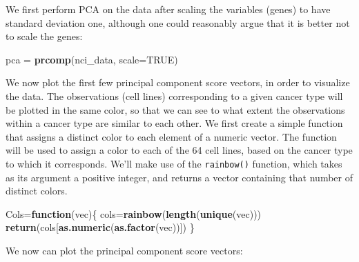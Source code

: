 \documentclass[
  openany]{book}
\newenvironment{Shaded}{\begin{snugshade}}{\end{snugshade}}
\newcommand{\ControlFlowTok}[1]{\textcolor[rgb]{0.13,0.29,0.53}{\textbf{#1}}}
\newcommand{\DataTypeTok}[1]{\textcolor[rgb]{0.13,0.29,0.53}{#1}}
\newcommand{\DecValTok}[1]{\textcolor[rgb]{0.00,0.00,0.81}{#1}}
\newcommand{\KeywordTok}[1]{\textcolor[rgb]{0.13,0.29,0.53}{\textbf{#1}}}
\newcommand{\NormalTok}[1]{#1}
\newcommand{\OperatorTok}[1]{\textcolor[rgb]{0.81,0.36,0.00}{\textbf{#1}}}
\newcommand{\OtherTok}[1]{\textcolor[rgb]{0.56,0.35,0.01}{#1}}
\newcommand{\StringTok}[1]{\textcolor[rgb]{0.31,0.60,0.02}{#1}}
\begin{document}
We first perform PCA on the data after scaling the variables (genes) to
have standard deviation one, although one could reasonably argue that it
is better not to scale the genes:

\begin{Shaded}
\begin{Highlighting}[]
\NormalTok{pca =}\StringTok{ }\KeywordTok{prcomp}\NormalTok{(nci_data, }\DataTypeTok{scale=}\OtherTok{TRUE}\NormalTok{)}
\end{Highlighting}
\end{Shaded}

We now plot the first few principal component score vectors, in order to
visualize the data. The observations (cell lines) corresponding to a given
cancer type will be plotted in the same color, so that we can see to what
extent the observations within a cancer type are similar to each other. We
first create a simple function that assigns a distinct color to each element
of a numeric vector. The function will be used to assign a color to each of
the 64 cell lines, based on the cancer type to which it corresponds.
We'll make use of the \texttt{rainbow()} function, which takes as its argument a positive integer,
and returns a vector containing that number of distinct colors.

\begin{Shaded}
\begin{Highlighting}[]
\NormalTok{Cols=}\ControlFlowTok{function}\NormalTok{(vec)\{}
\NormalTok{    cols=}\KeywordTok{rainbow}\NormalTok{(}\KeywordTok{length}\NormalTok{(}\KeywordTok{unique}\NormalTok{(vec)))}
    \KeywordTok{return}\NormalTok{(cols[}\KeywordTok{as.numeric}\NormalTok{(}\KeywordTok{as.factor}\NormalTok{(vec))])}
\NormalTok{  \}}
\end{Highlighting}
\end{Shaded}

We now can plot the principal component score vectors:

\begin{Shaded}
\end{Shaded}
\end{document}
